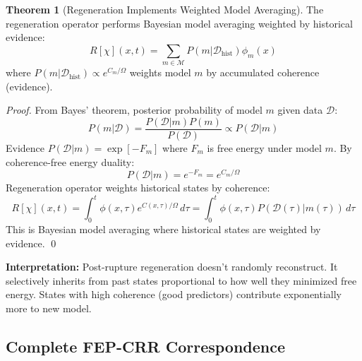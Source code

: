\documentclass[11pt,a4paper]{article}
\theoremstyle{definition}
\newtheorem{theorem}{Theorem}[section]
\theoremstyle{remark}
\begin{document}
\begin{theorem}[Regeneration Implements Weighted Model Averaging]
The regeneration operator performs Bayesian model averaging weighted by historical evidence:
\begin{equation}
R[\chi](x,t) = \sum_{m \in \mathcal{M}} P(m|\mathcal{D}_{\text{hist}}) \phi_m(x)
\label{eq:bayesian-regeneration}
\end{equation}
where $P(m|\mathcal{D}_{\text{hist}}) \propto e^{C_m/\Omega}$ weights model $m$ by accumulated coherence (evidence).
\end{theorem}

\begin{proof}
From Bayes' theorem, posterior probability of model $m$ given data $\mathcal{D}$:
\begin{equation}
P(m|\mathcal{D}) = \frac{P(\mathcal{D}|m)P(m)}{P(\mathcal{D})} \propto P(\mathcal{D}|m)
\end{equation}
Evidence $P(\mathcal{D}|m) = \exp[-F_m]$ where $F_m$ is free energy under model $m$. By coherence-free energy duality:
\begin{equation}
P(\mathcal{D}|m) = e^{-F_m} = e^{C_m/\Omega}
\end{equation}
Regeneration operator weights historical states by coherence:
\begin{equation}
R[\chi](x,t) = \int_0^t \phi(x,\tau) e^{C(x,\tau)/\Omega}\,d\tau = \int_0^t \phi(x,\tau) P(\mathcal{D}(\tau)|m(\tau))\,d\tau
\end{equation}
This is Bayesian model averaging where historical states are weighted by evidence. \qed
\end{proof}

\textbf{Interpretation:} Post-rupture regeneration doesn't randomly reconstruct. It selectively inherits from past states proportional to how well they minimized free energy. States with high coherence (good predictors) contribute exponentially more to new model.

\subsection{Complete FEP-CRR Correspondence}
\end{document}
